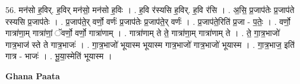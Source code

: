 \documentclass[17pt]{extarticle}
\begin{document}
56. मन॑सो ह॒विर्. ह॒विर् मन॑सो॒ मन॑सो ह॒विः । . ह॒वि र॑स्यसि ह॒विर्. ह॒वि र॑सि । . अ॒सि॒ प्र॒जाप॑तेः प्र॒जाप॑ते रस्यसि प्र॒जाप॑तेः । . प्र॒जाप॑ते॒र् वर्णो॒ वर्णः॑ प्र॒जाप॑तेः प्र॒जाप॑ते॒र् वर्णः॑ । . प्र॒जाप॑ते॒रिति॑ प्र॒जा - प॒तेः॒ । . वर्णो॒ गात्रा॑णा॒म् गात्रा॑णां॒ ॅवर्णो॒ वर्णो॒ गात्रा॑णाम् । . गात्रा॑णाम् ते ते॒ गात्रा॑णा॒म् गात्रा॑णाम् ते । . ते॒ गा॒त्र॒भाजो॑ गात्र॒भाज॑ स्ते ते गात्र॒भाजः॑ । . गा॒त्र॒भाजो॑ भूयास्म भूयास्म गात्र॒भाजो॑ गात्र॒भाजो॑ भूयास्म । . गा॒त्र॒भाज॒ इति॑ गात्र - भाजः॑ । . भू॒या॒स्मेति॑ भूयास्म । \newline

\textbf{Ghana Paata } \newline
\end{document}
